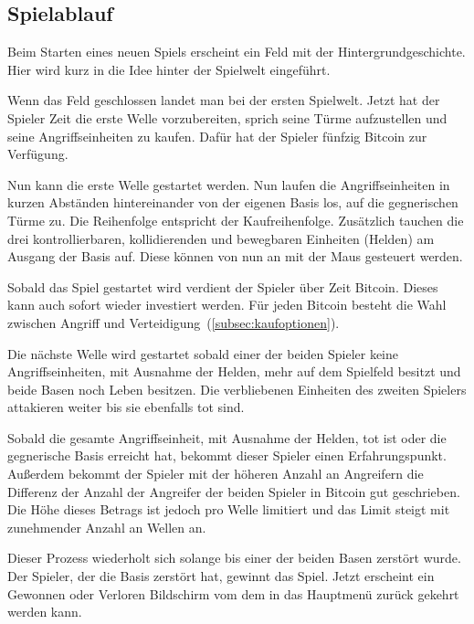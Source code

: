 \subsection{Spielablauf}

Beim Starten eines neuen Spiels erscheint ein Feld mit der
Hintergrundgeschichte. Hier wird kurz in die Idee hinter der Spielwelt
eingeführt.

Wenn das Feld geschlossen landet man bei der ersten Spielwelt. Jetzt hat der 
Spieler Zeit die erste Welle vorzubereiten, sprich seine Türme aufzustellen 
und seine Angriffseinheiten zu kaufen. Dafür hat der Spieler fünfzig Bitcoin
zur Verfügung.

Nun kann die erste Welle gestartet werden.
Nun laufen die Angriffseinheiten in kurzen Abständen hintereinander von der
eigenen Basis los, auf die gegnerischen Türme zu. Die Reihenfolge entspricht
der Kaufreihenfolge. Zusätzlich tauchen die drei kontrollierbaren,
kollidierenden und bewegbaren Einheiten (Helden) am Ausgang der Basis auf. Diese
können von nun an mit der Maus gesteuert werden.

Sobald das Spiel gestartet wird verdient der Spieler über Zeit Bitcoin. Dieses
kann auch sofort wieder investiert werden. Für jeden Bitcoin besteht die
Wahl zwischen Angriff und Verteidigung~(\ref{subsec:kaufoptionen}).

Die nächste Welle wird gestartet sobald einer der beiden Spieler keine 
Angriffseinheiten, mit Ausnahme der Helden, mehr auf dem Spielfeld besitzt
und beide Basen noch Leben besitzen. Die verbliebenen Einheiten des zweiten 
Spielers attakieren weiter bis sie ebenfalls tot sind.

Sobald die gesamte Angriffseinheit, mit Ausnahme der Helden, tot ist oder die 
gegnerische Basis erreicht hat, bekommt dieser Spieler einen Erfahrungspunkt. 
Außerdem bekommt der Spieler mit der höheren Anzahl an Angreifern die 
Differenz der Anzahl der Angreifer der beiden Spieler in Bitcoin gut geschrieben.
Die Höhe dieses Betrags ist jedoch pro Welle limitiert und das Limit steigt 
mit zunehmender Anzahl an Wellen an.

Dieser Prozess wiederholt sich solange bis einer der beiden Basen zerstört 
wurde. Der Spieler, der die Basis zerstört hat, gewinnt das Spiel. 
Jetzt erscheint ein Gewonnen oder Verloren Bildschirm vom dem in das Hauptmenü
zurück gekehrt werden kann.
